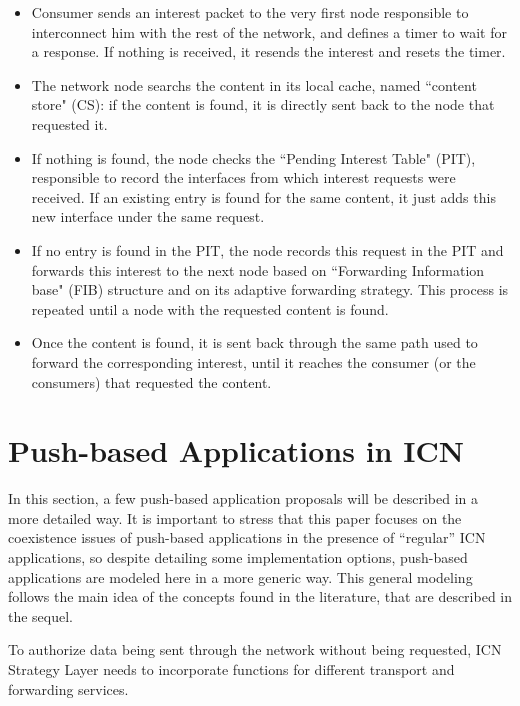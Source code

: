 \documentclass[11pt,conference]{./IEEEtran}
\begin{document}
	\begin{itemize}

		\item Consumer sends an interest packet to the very first node responsible to interconnect him with the rest of the network, and defines a timer to wait for a response. If nothing is received, it resends the interest and resets the timer.
		
		\item The network node searchs the content in its local cache, named ``content store" (CS): if the content is found, it is directly sent back to the node that requested it. 
		
		\item If nothing is found, the node checks the ``Pending Interest Table" (PIT), responsible to record the interfaces from which interest requests were received. If an existing entry is found for the same content, it just adds this new interface under the same request. 
		
		\item If no entry is found in the PIT, the node records this request in the PIT and forwards this interest to the next node based on ``Forwarding Information base" (FIB) structure and on its adaptive forwarding strategy. This process is repeated until a node with the requested content is found.

		\item Once the content is found, it is sent back through the same path used to forward the corresponding interest, until it reaches the consumer (or the consumers) that requested the content. 

	\end{itemize}


	\section{Push-based Applications in ICN}  \label{sec:pushbased}


	In this section, a few push-based application proposals will be described in a more detailed way. It is important to stress that this paper focuses on the coexistence issues of push-based applications in the presence of ``regular'' ICN applications, so despite detailing some implementation options, push-based applications are modeled here in a more generic way. This general modeling follows the main idea of the concepts found in the literature, that are described in the sequel.  

	To authorize data being sent through the network without being requested, ICN Strategy Layer needs to incorporate functions for different transport and forwarding services. 
\end{document}
